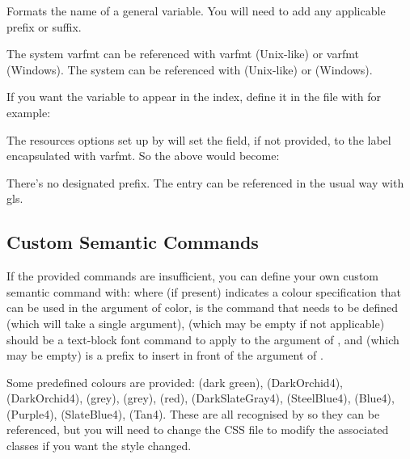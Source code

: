 \documentclass[toc=listof]{scrreport}
\begin{document}
Formats the name of a general variable. You will need to add any applicable
prefix or suffix.
\begin{coderesult}
The system \gls{varfmt} 
can be referenced with
\gls{varfmt}
(Unix-like) or
\gls{varfmt}
(Windows).
\tcblower
The system  
can be referenced with
(Unix-like) or
(Windows).
\end{coderesult}

If you want the variable to appear in the index, define it in
the  file with  for example:
\begin{codebox}
\end{codebox}
The resources options set up by  will set 
the  field, if not provided, to the label encapsulated
with \gls{varfmt}. So the above would become:
\begin{codebox}
\end{codebox}
There's no designated prefix. The entry can be referenced in the
usual way with \gls{gls}.

\subsection{Custom Semantic Commands}
\label{sec:customsemanticcmds}

If the provided commands are insufficient, you can define your own
custom semantic command with:
where  (if present) indicates a colour specification
that can be used in the argument of \gls{color},  is the
command that needs to be defined (which will take a single argument), 
 (which may be empty if not applicable) should be a 
text-block font command to apply to the argument of , and
 (which may be empty) is a prefix to insert in front of
the argument of .

Some predefined colours are provided: 
 (dark green), 
 (DarkOrchid4), 
 (DarkOrchid4), 
 (grey), 
 (grey), 
 (red),
 (DarkSlateGray4),
 (SteelBlue4),
 (Blue4),
 (Purple4),
 (SlateBlue4),
 (Tan4).
These are all recognised by  so they can be
referenced, but you will need to change the CSS file to modify the
associated classes if you want the style changed.
\end{document}
